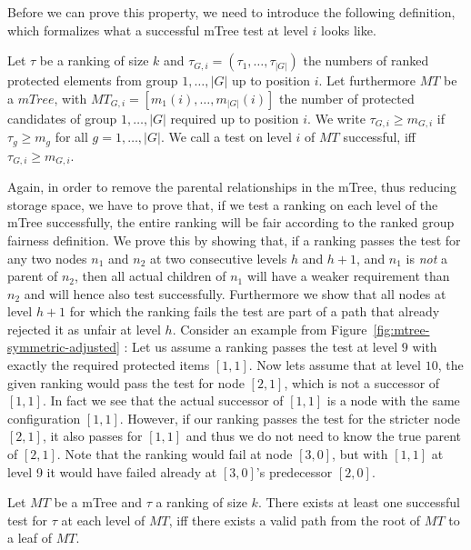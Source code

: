 Before we can prove this property, we need to introduce the following definition, which formalizes what a successful mTree test at level $i$ looks like.
%
\begin{definition}
\label{def:valid-mtree-test}
Let $\tau$ be a ranking of size $k$ and $\tau_{G,i}=(\tau_{1},\ldots,\tau_{|G|})$ the numbers of ranked protected elements from group $1,\ldots,|G|$ up to position $i$.
%
Let furthermore $MT$ be a $mTree$, with $MT_{G,i}=[m_1(i),\ldots,m_{|G|}(i)]$ the number of protected candidates of group $1,\ldots,|G|$ required up to position $i$.
%
We write $\tau_{G,i} \geq m_{G,i}$ if $\tau_g \geq m_g$ for all $g=1,\ldots,|G|$.
%
We call a test on level $i$ of $MT$ successful, iff $\tau_{G,i} \geq m_{G,i}$.
\end{definition}
%
Again, in order to remove the parental relationships in the mTree, thus reducing storage space, we have to prove that, if we test a ranking on each level of the mTree successfully, the entire ranking will be fair according to the ranked group fairness definition.
%
We prove this by showing that, if a ranking passes the test for any two nodes $n_1$ and $n_2$ at two consecutive levels $h$ and $h+1$, and $n_1$ is \emph{not} a parent of $n_2$, then all actual children of $n_1$ will have a weaker requirement than $n_2$ and will hence also test successfully.
%
Furthermore we show that all nodes at level $h+1$ for which the ranking fails the test are part of a path that already rejected it as unfair at level $h$.
%
Consider an example from Figure~\ref{fig:mtree-symmetric-adjusted} : Let us assume a ranking passes the test at level $9$ with exactly the required protected items $[1,1]$.
%
Now lets assume that at level $10$, the given ranking would pass the test for node $[2,1]$, which is not a successor of $[1,1]$.
%
In fact we see that the actual successor of $[1,1]$ is a node with the same configuration $[1,1]$.
%
However, if our ranking passes the test for the stricter node $[2,1]$, it also passes for $[1,1]$ and thus we do not need to know the true parent of $[2,1]$.
%
Note that the ranking would fail at node $[3,0]$, but with $[1,1]$ at level 9 it would have failed already at $[3,0]$'s predecessor $[2,0]$.
%
\begin{theorem}
\label{theorem:lazy-mTree-test}
Let $MT$ be a mTree and $\tau$ a ranking of size $k$.
%
There exists at least one successful test for $\tau$ at each level of $MT$,
iff there exists a valid path from the root of $MT$ to a leaf of $MT$.
\end{theorem}
